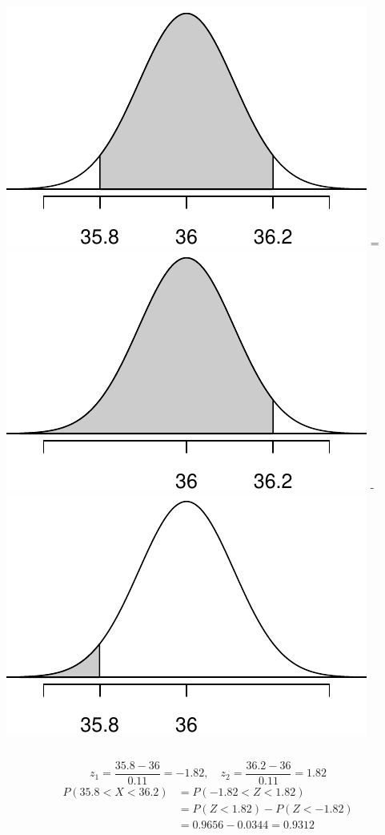 \documentclass[slidestop,compress,mathserif]{beamer}
\begin{document}
\begin{frame}
\begin{columns}[c]
\includegraphics[width=\textwidth]{figures/ketchupBET}
=
\includegraphics[width=\textwidth]{figures/ketchupLT362}
-
\includegraphics[width=\textwidth]{figures/ketchupLT358}
\end{columns}
\pause
\[z_1 = \frac{35.8 - 36}{0.11} = -1.82, \quad
z_2 = \frac{36.2 - 36}{0.11} = 1.82
\]
\begin{align*}
P(35.8 < X < 36.2) &= P(-1.82 < Z < 1.82) \\
&= P(Z < 1.82) - P(Z < -1.82) \\
&= 0.9656 - 0.0344 = 0.9312
\end{align*}

\end{frame}
\end{document}
